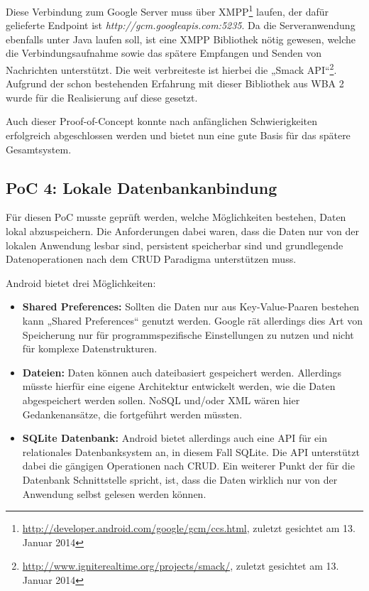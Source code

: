 Diese Verbindung zum Google Server muss über XMPP\footnote{\url{http://developer.android.com/google/gcm/ccs.html}, zuletzt gesichtet am 13. Januar 2014} laufen, der dafür gelieferte Endpoint ist \textit{http://gcm.googleapis.com:5235}. Da die Serveranwendung ebenfalls unter Java laufen soll, ist eine XMPP Bibliothek nötig gewesen, welche die Verbindungsaufnahme sowie das spätere Empfangen und Senden von Nachrichten unterstützt. Die weit verbreiteste ist hierbei die „Smack API“\footnote{\url{http://www.igniterealtime.org/projects/smack/}, zuletzt gesichtet am 13. Januar 2014}. Aufgrund der schon bestehenden Erfahrung mit dieser Bibliothek aus WBA 2 wurde für die Realisierung auf diese gesetzt.

Auch dieser Proof-of-Concept konnte nach anfänglichen Schwierigkeiten erfolgreich abgeschlossen werden und bietet nun eine gute Basis für das spätere Gesamtsystem.

\subsection{PoC 4: Lokale Datenbankanbindung}

Für diesen PoC musste geprüft werden, welche Möglichkeiten bestehen, Daten lokal abzuspeichern. Die Anforderungen dabei waren, dass die Daten nur von der lokalen Anwendung lesbar sind, persistent speicherbar sind und grundlegende Datenoperationen nach dem CRUD Paradigma unterstützen muss.

Android bietet drei Möglichkeiten:

\begin{itemize}
	\item \textbf{Shared Preferences:} Sollten die Daten nur aus Key-Value-Paaren bestehen kann „Shared Preferences“ genutzt werden. Google rät allerdings dies Art von Speicherung nur für programmspezifische Einstellungen zu nutzen und nicht für komplexe Datenstrukturen.
	\item \textbf{Dateien:} Daten können auch dateibasiert gespeichert werden. Allerdings müsste hierfür eine eigene Architektur entwickelt werden, wie die Daten abgespeichert werden sollen. NoSQL und/oder XML wären hier Gedankenansätze, die fortgeführt werden müssten.
	\item \textbf{SQLite Datenbank:} Android bietet allerdings auch eine API für ein relationales Datenbanksystem an, in diesem Fall SQLite. Die API unterstützt dabei die gängigen Operationen nach CRUD. Ein weiterer Punkt der für die Datenbank Schnittstelle spricht, ist, dass die Daten wirklich nur von der Anwendung selbst gelesen werden können.
\end{itemize}

